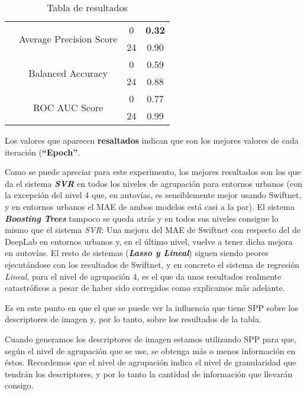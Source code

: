 \begin{table}[H]
{\begin{tabular}{|c|c|c|c|}
& \multirow{2}{3cm}{Average Precision Score} & 0 & \textbf{0.32} \\ \cline{3-4}
& & 24 & 0.90 \\ \cline{2-4}
& \multirow{2}{3cm}{Balanced Accuracy} & 0 & 0.59 \\ \cline{3-4}
& & 24 & 0.88 \\ \cline{2-4}
& \multirow{2}{3cm}{ROC AUC Score} & 0 & 0.77 \\ \cline{3-4}
& & 24 & 0.99 \\ \cline{1-4}
\end{tabular}}
\caption{Tabla de resultados} %
\label{tab:Resul_ISA2}
\end{table}

Los valores que aparecen \textbf{resaltados} indican que son los mejores valores de cada iteración (\textbf{``Epoch''}.

Como se puede apreciar para este experimento, los mejores resultados son los que da el sistema \textbf{\textit{\ac{SVR}}} en todos los niveles de agrupación para entornos urbanos (con la excepción del nivel 4 que, en autovías, es sensiblemente mejor usando Swiftnet, y en entornos urbanos el \ac{MAE} de ambos modelos está casi a la par). El sistema \textbf{\textit{Boosting Trees}} tampoco se queda atrás y en todos sus niveles consigue lo mismo que el sistema \textit{\ac{SVR}}: Una mejora del \ac{MAE} de Swiftnet con respecto del de DeepLab en entornos urbanos y, en el último nivel, vuelve a tener dicha mejora en autovías. El resto de sistemas (\textbf{\textit{Lasso y Lineal}}) siguen siendo peores ejecutándose con los resultados de Swiftnet, y en concreto el sistema de regresión \textit{Lineal}, para el nivel de agrupación 4, es el que da unos resultados realmente catastróficos a pesar de haber sido corregidos como explicamos más adelante.%

Es en este punto en que el que se puede ver la influencia que tiene \ac{SPP} sobre los descriptores de imagen y, por lo tanto, sobre los resultados de la tabla.

Cuando generamos los descriptores de imagen estamos utilizando \ac{SPP} para que, según el nivel de agrupación que se use, se obtenga más o menos información en éstos. Recordemos que el nivel de agrupación indica el nivel de granularidad que tendrán los descriptores, y por lo tanto la cantidad de información que llevarán consigo.

